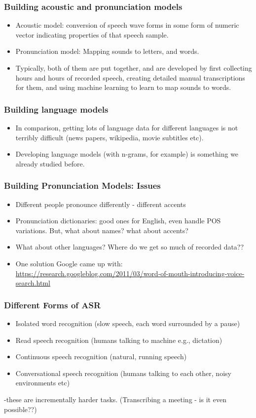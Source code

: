 \documentclass{beamer}
\begin{document}
\begin{frame}
\frametitle{Building acoustic and pronunciation models}
\begin{itemize}
\item Acoustic model: conversion of speech wave forms in some form of numeric vector indicating properties of that speech sample.
\item Pronunciation model: Mapping sounds to letters, and words.
\item Typically, both of them are put together, and are developed by first collecting hours and hours of recorded speech, creating detailed manual transcriptions for them, and using machine learning to learn to map sounds to words.
\end{itemize}
\end{frame}

\begin{frame}
\frametitle{Building language models}
\begin{itemize}
\item In comparison, getting lots of language data for different languages is not terribly difficult (news papers, wikipedia, movie subtitles etc). 
\item Developing language models (with n-grams, for example) is something we already studied before.
\end{itemize}
\end{frame}

\begin{frame}
\frametitle{Building Pronunciation Models: Issues}
\begin{itemize}
\item Different people pronounce differently - different accents \pause
\item Pronunciation dictionaries: good ones for English, even handle POS variations. But, what about names? what about accents? \pause
\item What about other languages? Where do we get so much of recorded data?? \pause
\item One solution Google came up with: \url{https://research.googleblog.com/2011/03/word-of-mouth-introducing-voice-search.html}
\end{itemize}
\end{frame}

\begin{frame}
\frametitle{Different Forms of ASR}
\begin{itemize}
\item Isolated word recognition (slow speech, each word surrounded by a pause)
\item Read speech recognition (humans talking to machine e.g., dictation)
\item Continuous speech recognition (natural, running speech)
\item Conversational speech recognition (humans talking to each other, noisy environments etc)
\end{itemize}
-these are incrementally harder tasks. (Transcribing a meeting - is it even possible??)
\end{frame}
\end{document}
